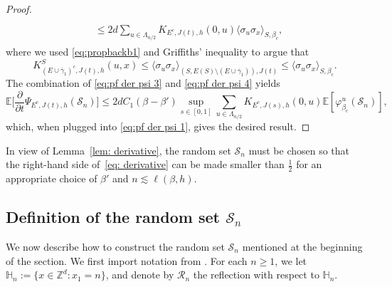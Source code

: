 \documentclass[11pt,a4paper]{article}
\numberwithin{equation}{section}
\theoremstyle{plain}
\theoremstyle{definition}
\begin{document}
\begin{proof}
\begin{align}
\begin{aligned}
\\&\leq 2d\sum_{u\in \Lambda_{n/2}}K_{E^c,J(t),h}(0,u)\langle \sigma_u\sigma_x\rangle_{S,\beta_c},
\end{aligned}
\end{align}
where we used \eqref{eq:propbackb1} and Griffiths' inequality to argue that \begin{equation}
K_{(E\cup\overline{\gamma}_1)^c,J(t),h}^S(u,x)\leq\langle \sigma_{u}\sigma_x\rangle_{(S,E(S)\setminus(E\cup\overline{\gamma}_1)),J(t)} \leq \langle \sigma_u\sigma_x\rangle_{S,\beta_c}.
\end{equation}
The combination of \eqref{eq:pf der psi 3} and \eqref{eq:pf der psi 4} yields
\begin{equation}
	\mathbb E\Big[\frac{\partial}{\partial t}\Psi_{E^c,J(t),h}(\mathcal S_n)\Big]\leq 2dC_1(\beta-\beta') \sup_{s\in [0,1]} \sum_{u\in \Lambda_{n/2}}K_{E^c,J(s),h}(0,u)\mathbb E[\varphi_{\beta_c}^u(\mathcal S_n)],
\end{equation}
which, when plugged into \eqref{eq:pf der psi 1}, gives the desired result.
\end{proof}


In view of Lemma~\ref{lem: derivative}, the random set $\mathcal{S}_n$ 
must be chosen so that the right-hand side of~\eqref{eq: derivative} can 
be made smaller than $\tfrac{1}{2}$ for an appropriate choice of $\beta'$ and $n\lesssim\ell(\beta,h)$.


\subsection{Definition of the random set $\mathcal S_n$}\label{sec:definition of S_n}


We now describe how to construct the random set $\mathcal S_n$ mentioned at the beginning of the section. We first import notation from \cite{AizenmanDuminilTassionWarzelEmergentPlanarity2019,DuminilPanis2024newLB}. For each $n\geq 1$, we let $\mathbb H_n:=\{x\in \mathbb Z^d: x_1=n\}$, and denote by $\mathcal R_n$ the reflection with respect to $\mathbb H_n$. 
\end{document}
